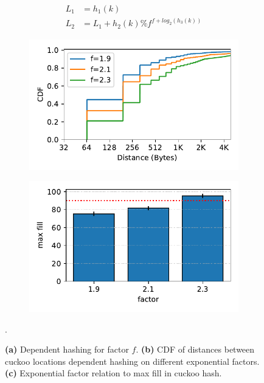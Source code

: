 \begin{figure}[t]
    \centering
    \begin{subfigure}{0.3\linewidth}
        \begin{align*}
            L_1 &= h_1(k) \\
            L_2 &= L_1 + h_2(k) \% f^{f + log_2(h_3(k))}
        \end{align*}
    \end{subfigure}
    \begin{subfigure}{0.3\linewidth}
        \includegraphics[width=0.99\linewidth]{fig/hash_factor.pdf}
    \end{subfigure}
    \begin{subfigure}{0.3\linewidth}
        \includegraphics[width=0.99\linewidth]{fig/hash_fill.pdf}
    \end{subfigure}.
    \vspace{-1em}
    \caption{
    \textbf{(a)} Dependent hashing for factor $f$.
    \textbf{(b)} CDF of distances between cuckoo locations dependent hashing on different exponential factors.
    \textbf{(c)} Exponential factor relation to max fill in cuckoo hash.
    }
    \label{fig:locality-hashing}

\end{figure}




